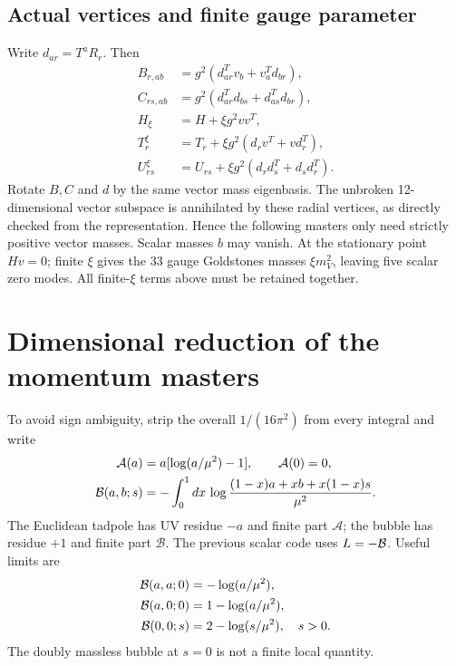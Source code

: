 \documentclass[11pt]{article}
\begin{document}
\subsection{Actual vertices and finite gauge parameter}
Write $d_{ar}=T^aR_r$. Then
\begin{align}
 B_{r,ab}&=g^2(d_{ar}^Tv_b+v_a^Td_{br}),\\
 C_{rs,ab}&=g^2(d_{ar}^Td_{bs}+d_{as}^Td_{br}),\\
 H_\xi&=H+\xi g^2vv^T,\\
 T^\xi_r&=T_r+\xi g^2(d_rv^T+vd_r^T),\\
 U^\xi_{rs}&=U_{rs}+\xi g^2(d_rd_s^T+d_sd_r^T).
\end{align}
Rotate $B,C$ and $d$ by the same vector mass eigenbasis.
The unbroken 12-dimensional vector subspace is annihilated by these
radial vertices, as directly checked from the representation.
Hence the following masters only need strictly positive vector masses.
Scalar masses $b$ may vanish. At the stationary point $Hv=0$; finite
$\xi$ gives the 33 gauge Goldstones masses $\xi m_V^2$, leaving five
scalar zero modes. All finite-$\xi$ terms above must be retained together.

\section{Dimensional reduction of the momentum masters}
To avoid sign ambiguity, strip the overall $1/(16\pi^2)$ from every
integral and write
\begin{align}
 {\cal A}(a)&=a[\log(a/\mu^2)-1],\qquad {\cal A}(0)=0,\\
 {\cal B}(a,b;s)&=-\int_0^1 dx\,
       \log\frac{(1-x)a+xb+x(1-x)s}{\mu^2}.
\end{align}
The Euclidean tadpole has UV residue $-a$ and finite part $\mathcal A$;
the bubble has residue $+1$ and finite part $\mathcal B$.
The previous scalar code uses $L=-{\cal B}$. Useful limits are
\begin{align}
 {\cal B}(a,a;0)&=-\log(a/\mu^2),\\
 {\cal B}(a,0;0)&=1-\log(a/\mu^2),\\
 {\cal B}(0,0;s)&=2-\log(s/\mu^2),\quad s>0.
\end{align}
The doubly massless bubble at $s=0$ is not a finite local quantity.
\end{document}

